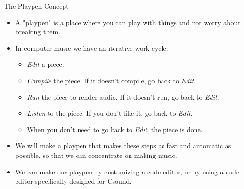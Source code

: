 \documentclass{beamer}
\begin{document}
    \begin{frame}{The Playpen Concept}
        \begin{itemize}
            \item A "playpen" is a place where you can play with things and not worry 
            about breaking them.
            \item In computer music we have an iterative work cycle:
            	\begin{itemize}
		   \item \textit{Edit} a piece.
		   \item \textit{Compile} the piece. If it doesn't compile, go back to \textit{Edit}.
		   \item \textit{Run} the piece to render audio. If it doesn't run, go back to \emph{Edit}.
		   \item \textit{Listen} to the piece. If you don't like it, go back to \emph{Edit}.
		   \item When you don't need to go back to \emph{Edit}, the piece is done.
	        \end{itemize}
            \item  We will make a playpen that makes these steps as fast and 
            automatic as possible, so that we can concentrate on making music.
            \item We can make our playpen by customizing a code editor, or by 
            using a code editor specifically designed for Csound.
          \end{itemize}    
    \end{frame}
    
\end{document}
